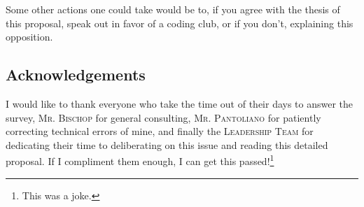\documentclass{report}
\begin{document}
Some other actions one could take would be to, if you agree with the thesis of this proposal, speak out in favor of a coding club, or if you don't, explaining this opposition.

\subsection*{Acknowledgements}

I would like to thank everyone who take the time out of their days to answer the survey, \textsc{Mr. Bischop} for general consulting, \textsc{Mr. Pantoliano} for patiently correcting technical errors of mine, and finally the \textsc{Leadership Team} for dedicating their time to deliberating on this issue and reading this detailed proposal. If I compliment them enough, I can get this passed!\footnote{This was a joke.}
\end{document}
